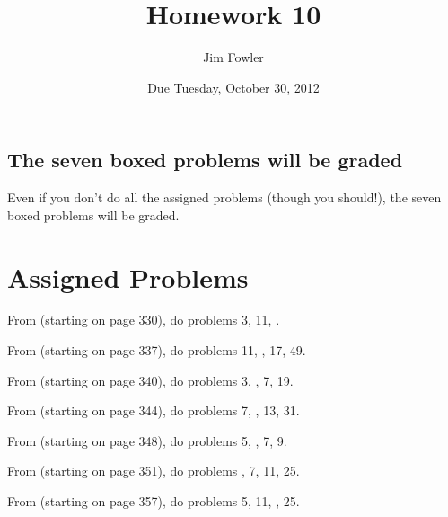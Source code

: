 \documentclass[12pt]{handout}
\title{Homework 10}
\date{Due Tuesday, October 30, 2012}
\author{Jim Fowler}
\begin{document}
\maketitle










\subsection*{The seven boxed problems will be graded}
Even if you don't do all the assigned problems (though you should!), the seven boxed problems will be graded.

\section*{Assigned Problems}

From  (starting on page 330),
do problems 3, 11, .
\vspace{1ex}

From  (starting on page 337),
do problems 11, , 17, 49.
\vspace{1ex}

From  (starting on page 340),
do problems 3, , 7, 19.
\vspace{1ex}

From  (starting on page 344),
do problems 7, , 13, 31.
\vspace{1ex}

From  (starting on page 348),
do problems 5, , 7, 9.
\vspace{1ex}

From  (starting on page 351),
do problems , 7, 11, 25.
\vspace{1ex}

From  (starting on page 357),
do problems 5, 11, , 25.
\vspace{1ex}
\end{document}
